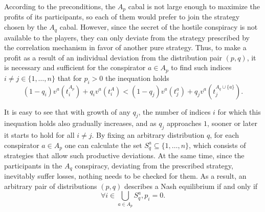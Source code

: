 According to the preconditions, the $A_p$ cabal is not large enough to maximize the profits of its participants, so each of them would prefer to join the strategy chosen by the $A_q$ cabal. However, since the secret of the hostile conspiracy is not available to the players, they can only deviate from the strategy prescribed by the correlation mechanism in favor of another pure strategy. Thus, to make a profit as a result of an individual deviation from the distribution pair $(p, q)$, it is necessary and sufficient for the conspirator $a \in A_p$ to find such indices $i \neq j \in \{1, \ldots, n\}$ that for $p_i > 0$ the inequation holds%
\begin{equation*}
	(1 - q_i) v^a(t_i^{A_p}) + q_i v^a(t_i^A) < (1 - q_j) v^a(t_j^a) + q_j v^a(t_j^{A_q \cup \{a\}}).
\end{equation*}

It is easy to see that with growth of any $q_j$, the number of indices $i$ for which this inequation holds also gradually increases, and as $q_j$ approaches $1$, sooner or later it starts to hold for all $i \neq j$. By fixing an arbitrary distribution $q$, for each conspirator $a \in A_p$ one can calculate the set $S^a_q \subseteq \{1, \ldots, n\}$, which consists of strategies that allow such productive deviations. At the same time, since the participants in the $A_q$ conspiracy, deviating from the prescribed strategy, inevitably suffer losses, nothing needs to be checked for them. As a result, an arbitrary pair of distributions $(p, q)$ describes a Nash equilibrium if and only if %
\begin{equation*}
	\forall i \in \bigcup_{a \in A_p} S^a_q, p_i = 0.
\end{equation*}

